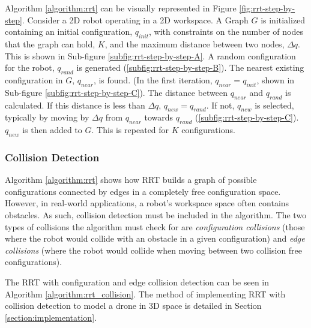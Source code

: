         

        Algorithm \ref{algorithm:rrt} can be visually represented in Figure \ref{fig:rrt-step-by-step}. Consider a \gls{2D} robot operating in a \gls{2D} workspace. A Graph $G$ is initialized containing an initial \gls{configuration}, $q_{init}$, with constraints on the number of nodes that the graph can hold, $K$, and the maximum distance between two nodes, $\Delta q$. This is shown in Sub-figure \ref{subfig:rrt-step-by-step-A}. A random \gls{configuration} for the robot, $q_{rand}$ is generated (\ref{subfig:rrt-step-by-step-B}). The nearest existing \gls{configuration} in $G$, $q_{near}$, is found. (In the first iteration, $q_{near} = q_{init}$, shown in Sub-figure \ref{subfig:rrt-step-by-step-C}). The distance between $q_{near}$ and $q_{rand}$ is calculated. If this distance is less than $\Delta q$, $q_{new} = q_{rand}$. If not, $q_{new}$ is selected, typically by moving by $\Delta q$ from $q_{near}$ towards $q_{rand}$ (\ref{subfig:rrt-step-by-step-C}). $q_{new}$ is then added to $G$. This is repeated for $K$ \gls{configuration}s.

        

    \subsubsection{Collision Detection}

        Algorithm \ref{algorithm:rrt} shows how \gls{RRT} builds a graph of possible \gls{configuration}s connected by edges in a completely free \gls{configuration} space. However, in real-world applications, a robot's \gls{workspace} space often contains obstacles. As such, collision detection must be included in the algorithm. The two types of collisions the algorithm must check for are \textit{configuration collisions} (those where the robot would collide with an obstacle in a given \gls{configuration}) and \textit{edge collisions} (where the robot would collide when moving between two collision free \gls{configuration}s).

        The RRT with \gls{configuration} and edge collision detection can be seen in Algorithm \ref{algorithm:rrt_collision}. The method of implementing \gls{RRT} with collision detection to model a drone in 3D space is detailed in Section \ref{section:implementation}.

